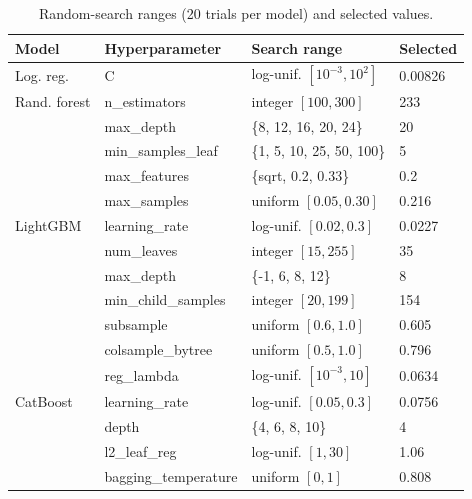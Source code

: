 \begin{table}[!t]
\centering
\caption{Random-search ranges (20 trials per model) and selected values.}
\label{tab:tuning}
\footnotesize
\setlength{\tabcolsep}{3.5pt}
\begin{tabular}{llll}
\hline
Model & Hyperparameter & Search range & Selected \\
\hline
Log. reg. & C & log-unif. $[10^{-3}, 10^{2}]$ & 0.00826 \\
\hline
Rand. forest & n\_estimators & integer $[100, 300]$ & 233 \\
 & max\_depth & \{8, 12, 16, 20, 24\} & 20 \\
 & min\_samples\_leaf & \{1, 5, 10, 25, 50, 100\} & 5 \\
 & max\_features & \{sqrt, 0.2, 0.33\} & 0.2 \\
 & max\_samples & uniform $[0.05, 0.30]$ & 0.216 \\
\hline
LightGBM & learning\_rate & log-unif. $[0.02, 0.3]$ & 0.0227 \\
 & num\_leaves & integer $[15, 255]$ & 35 \\
 & max\_depth & \{-1, 6, 8, 12\} & 8 \\
 & min\_child\_samples & integer $[20, 199]$ & 154 \\
 & subsample & uniform $[0.6, 1.0]$ & 0.605 \\
 & colsample\_bytree & uniform $[0.5, 1.0]$ & 0.796 \\
 & reg\_lambda & log-unif. $[10^{-3}, 10]$ & 0.0634 \\
\hline
CatBoost & learning\_rate & log-unif. $[0.05, 0.3]$ & 0.0756 \\
 & depth & \{4, 6, 8, 10\} & 4 \\
 & l2\_leaf\_reg & log-unif. $[1, 30]$ & 1.06 \\
 & bagging\_temperature & uniform $[0, 1]$ & 0.808 \\
\hline
\end{tabular}
\end{table}
